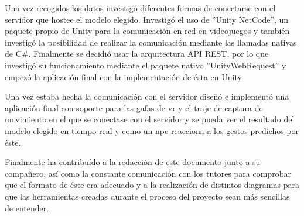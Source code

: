 Una vez recogidos los datos investigó diferentes formas de conectarse con el servidor que hostee el modelo elegido.
Investigó el uso de ''Unity NetCode'', un paquete propio de Unity para la comunicación en red en videojuegos y también investigó la posibilidad de realizar la comunicación mediante las llamadas nativas de C\#.
Finalmente se decidió usar la arquitectura \gls{API REST}, por lo que investigó su funcionamiento mediante el paquete nativo ''UnityWebRequest'' y empezó la aplicación final con la implementación de ésta en Unity.

Una vez estaba hecha la comunicación con el servidor diseñó e implementó una aplicación final con soporte para las gafas de \gls{vr} y el traje de captura de movimiento en el que se conectase con el servidor y se pueda ver el resultado del modelo elegido en tiempo real y como un \gls{npc} reacciona a los gestos predichos por éste.

Finalmente ha contribuído a la redacción de este documento junto a su compañero, así como la constante comunicación con los tutores para comprobar que el formato de éste era adecuado y a la realización de distintos diagramas para que las herramientas creadas durante el proceso del proyecto sean más sencillas de entender.